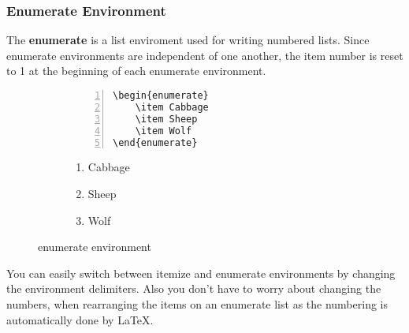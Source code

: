\documentclass{article}
\begin{document}
\subsubsection{Enumerate Environment}
The \textbf{enumerate} is a list enviroment used for writing numbered lists. Since enumerate environments are independent of one another, the item number is reset to 1 at the beginning of each enumerate environment.
\begin{figure}[h]
\centering
\begin{subfigure}{0.45\textwidth}
\begin{Verbatim}[numbers = left]
\begin{enumerate}
	\item Cabbage
	\item Sheep
	\item Wolf
\end{enumerate}
\end{Verbatim}
\end{subfigure}
\begin{subfigure}{0.45\textwidth}
\begin{enumerate}
	\item Cabbage
	\item Sheep
	\item Wolf
\end{enumerate}
\end{subfigure}
\caption{enumerate environment}
\end{figure}

You can easily switch between itemize and enumerate environments by changing the environment delimiters. Also you don't have to worry about changing the numbers, when rearranging the items on an enumerate list as the numbering is automatically done by \LaTeX{}.
\end{document}
